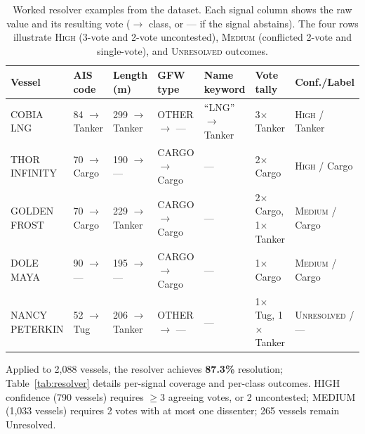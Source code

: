 \documentclass[journal]{IEEEtran}
\begin{document}
\begin{table}[t]
\centering
\caption{Worked resolver examples from the dataset.
Each signal column shows the raw value and its resulting vote
($\to$ class, or --- if the signal abstains).
The four rows illustrate \textsc{High} (3-vote and 2-vote uncontested),
\textsc{Medium} (conflicted 2-vote and single-vote), and
\textsc{Unresolved} outcomes.}
\label{tab:resolver_examples}
\small
\begin{tabular}{@{}lllllll@{}}
\toprule
Vessel & AIS code & Length (m) & GFW type & Name keyword & Vote tally & Conf./Label \\
\midrule
COBIA LNG
  & 84 $\to$ Tanker & 299 $\to$ Tanker & OTHER $\to$ ---   & ``LNG'' $\to$ Tanker
  & 3$\times$ Tanker & \textsc{High} / Tanker \\
THOR INFINITY
  & 70 $\to$ Cargo  & 190 $\to$ ---    & CARGO $\to$ Cargo & ---
  & 2$\times$ Cargo  & \textsc{High} / Cargo \\
GOLDEN FROST
  & 70 $\to$ Cargo  & 229 $\to$ Tanker & CARGO $\to$ Cargo & ---
  & 2$\times$ Cargo, 1$\times$ Tanker & \textsc{Medium} / Cargo \\
DOLE MAYA
  & 90 $\to$ ---    & 195 $\to$ ---    & CARGO $\to$ Cargo & ---
  & 1$\times$ Cargo  & \textsc{Medium} / Cargo \\
NANCY PETERKIN
  & 52 $\to$ Tug    & 206 $\to$ Tanker & OTHER $\to$ ---   & ---
  & 1$\times$ Tug, 1$\times$ Tanker & \textsc{Unresolved} / --- \\
\bottomrule
\end{tabular}
\end{table}

Applied to 2,088 vessels, the resolver achieves \textbf{87.3\%} resolution;
Table~\ref{tab:resolver} details per-signal coverage and per-class outcomes.
HIGH confidence (790 vessels) requires $\geq$3 agreeing votes, or 2 uncontested;
MEDIUM (1,033 vessels) requires 2 votes with at most one dissenter;
265 vessels remain Unresolved.
\end{document}
